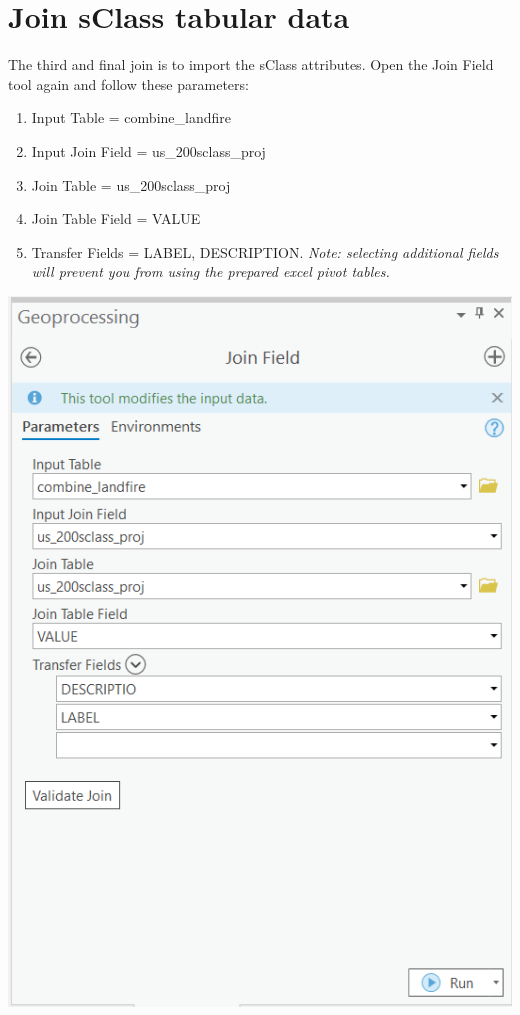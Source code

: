 \documentclass[
]{book}
\providecommand{\tightlist}{%
  \setlength{\itemsep}{0pt}\setlength{\parskip}{0pt}}
\begin{document}
\hypertarget{join-sclass-tabular-data}{%
\section{Join sClass tabular data}\label{join-sclass-tabular-data}}

The third and final join is to import the sClass attributes. Open the Join Field tool again and follow these parameters:

\begin{enumerate}
\def\labelenumi{\arabic{enumi}.}
\tightlist
\item
  Input Table = combine\_landfire
\item
  Input Join Field = us\_200sclass\_proj
\item
  Join Table = us\_200sclass\_proj
\item
  Join Table Field = VALUE
\item
  Transfer Fields = LABEL, DESCRIPTION. \emph{Note: selecting additional fields will prevent you from using the prepared excel pivot tables.}
\end{enumerate}

\includegraphics[width=1000px]{04_gis_screenshots/10_join_sclass}
\end{document}
